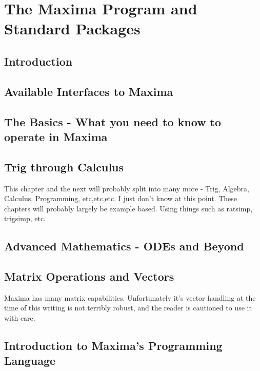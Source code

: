 \documentclass[oneside,english]{book}
\begin{document}
\part{The Maxima Program and Standard Packages}

\chapter{Introduction}
  

\chapter{Available Interfaces to Maxima}
  

\chapter{The Basics - What you need to know to operate in Maxima}
  

\chapter{Trig through Calculus}

    This chapter and the next will probably split into many more - Trig,
    Algebra, Calculus, Programming, etc,etc,etc. I just don't know at
    this point. These chapters will probably largely be example based.
    Using things such as ratsimp, trigsimp, etc.
   
   
 
\chapter{Advanced Mathematics - ODEs and Beyond}

   

\chapter{Matrix Operations and Vectors}

    Maxima has many matrix capabilities. Unfortunately it's vector handling
    at the time of this writing is not terribly robust, and the reader
    is cautioned to use it with care.

\chapter{Introduction to Maxima's Programming Language}
  
\end{document}
